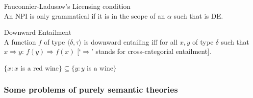 \documentclass[output=paper,colorlinks,citecolor=brown]{langscibook}
\begin{document}
\eanoraggedright\label{ex:12} Fauconnier-Ladusaw's Licensing condition\hfill \hfill \citep[100]{von1999npi}\\
An NPI is only grammatical if it is in the scope of an $\alpha$ such that \sib{$\alpha$} is DE.
\z

\eanoraggedright\label{ex:13}Downward Entailment\hfill\citep[100]{von1999npi}\\
A function $f$ of type $\langle \delta,\tau\rangle$ is downward entailing iff for all $x,y$ of type $\delta$ such that $x\Rightarrow y$: $f(y)\Rightarrow f(x)$ [`$\Rightarrow$' stands for cross-categorial entailment].
\z

\ea\label{ex:14}$\{x: x$ is a red wine$\} \subseteq \{y: y$ is a wine$\}$
\z

\subsubsection{Some problems of purely semantic theories\label{some-problems-of-purely-semantic-theories}}
\end{document}
